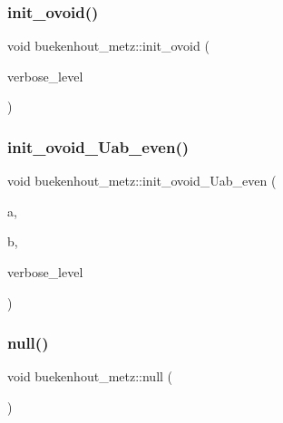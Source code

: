 \mbox{\label{classbuekenhout__metz_a217d76a8e2385ce176c4c461085ab065}} 
\subsubsection{\texorpdfstring{init\+\_\+ovoid()}{init\_ovoid()}}
{\footnotesize\ttfamily void buekenhout\+\_\+metz\+::init\+\_\+ovoid (\begin{DoxyParamCaption}\item[{\mbox{\hyperlink{galois_8h_a09fddde158a3a20bd2dcadb609de11dc}{I\+NT}}}]{verbose\+\_\+level }\end{DoxyParamCaption})}

\mbox{\label{classbuekenhout__metz_ae2add9715f3b70bfb635fdb8d33bfa71}} 
\subsubsection{\texorpdfstring{init\+\_\+ovoid\+\_\+\+Uab\+\_\+even()}{init\_ovoid\_Uab\_even()}}
{\footnotesize\ttfamily void buekenhout\+\_\+metz\+::init\+\_\+ovoid\+\_\+\+Uab\+\_\+even (\begin{DoxyParamCaption}\item[{\mbox{\hyperlink{galois_8h_a09fddde158a3a20bd2dcadb609de11dc}{I\+NT}}}]{a,  }\item[{\mbox{\hyperlink{galois_8h_a09fddde158a3a20bd2dcadb609de11dc}{I\+NT}}}]{b,  }\item[{\mbox{\hyperlink{galois_8h_a09fddde158a3a20bd2dcadb609de11dc}{I\+NT}}}]{verbose\+\_\+level }\end{DoxyParamCaption})}

\mbox{\label{classbuekenhout__metz_aace9e1882235a2f14602398dc42173c4}} 
\subsubsection{\texorpdfstring{null()}{null()}}
{\footnotesize\ttfamily void buekenhout\+\_\+metz\+::null (\begin{DoxyParamCaption}{ }\end{DoxyParamCaption})}

